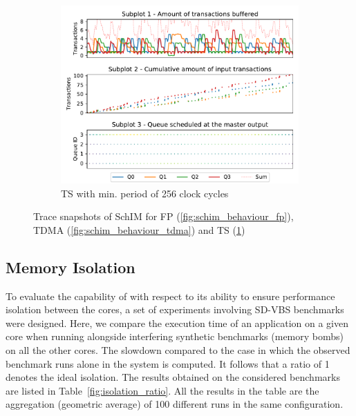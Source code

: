 \begin{figure}[]
\begin{subfigure}{0.45\textwidth}
      \end{subfigure}
      \hfill
      \begin{subfigure}{0.45\textwidth}
        \centering
        \includegraphics[scale=0.45]{images/SchIM_MG_buffering.pdf}
        \caption{TS with min. period of 256 clock cycles}
        \label{fig:schim_behaviour_mg}
      \end{subfigure}
      \caption{Trace snapshots of SchIM for FP (\ref{fig:schim_behaviour_fp}), TDMA (\ref{fig:schim_behaviour_tdma}) and TS (\ref{fig:schim_behaviour_mg})}
      \label{fig:schim_behaviour}
    \end{figure}

\subsection{Memory Isolation}\label{subsec:isolation}
To evaluate the capability of \schim with respect to its ability to
ensure performance isolation between the cores, a set of experiments
involving SD-VBS benchmarks were designed. Here, we compare the
execution time of an application on a given core when running
alongside interfering synthetic benchmarks (memory bombs) on all the
other cores. The slowdown compared to the case in which the observed
benchmark runs alone in the system is computed. It follows that a
ratio of 1 denotes the ideal isolation. The results obtained on the
considered benchmarks are listed in
Table~\ref{fig:isolation_ratio}. All the results in the table are the
aggregation (geometric average) of 100 different runs in the same
configuration.


